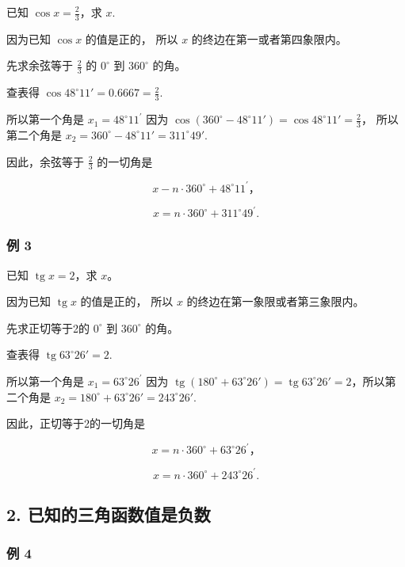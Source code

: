 已知 \(\cos x = \frac{2}{3}\)，求 \(x\).

 因为已知 \(\cos x\) 的值是正的， 所以 \(x\)
的终边在第一或者第四象限内。

先求余弦等于 \(\frac{2}{3}\) 的 \(0^{\circ}\) 到 \(360^{\circ}\) 的角。

查表得 \(\cos 48^{\circ}11' = 0.6667 = \frac{2}{3}\).

所以第一个角是 \(x_{1} = 48^{\circ}11^{\prime}\) 因为
\(\cos (360^{\circ} - 48^{\circ}11') = \cos 48^{\circ}11' = \frac{2}{3}\)，
所以第二个角是 \(x_{2} = 360^{\circ} - 48^{\circ}11' = 311^{\circ}49'\).

因此，余弦等于 \(\frac{2}{3}\) 的一切角是

\[
x - n \cdot 360 ^{\circ} + 48 ^{\circ} 11 ^{\prime}\text{，}
\]

\[
x = n \cdot 360 ^{\circ} + 311 ^{\circ} 49 ^{\prime}.
\]

\subsubsection{例 3}

已知 \(\operatorname{tg} x = 2\)，求 \(x\)。

 因为已知 \(\operatorname{tg} x\) 的值是正的， 所以 \(x\)
的终边在第一象限或者第三象限内。

先求正切等于2的 \(0^{\circ}\) 到 \(360^{\circ}\) 的角。

查表得 \(\operatorname{tg} 63^{\circ} 26' = 2\).

所以第一个角是 \(x_{1} = 63^{\circ}26^{\prime}\) 因为
\(\operatorname{tg}(180^{\circ} + 63^{\circ}26') = \operatorname{tg}63^{\circ}26' = 2\)，所以第二个角是
\(x_{2} = 180^{\circ} + 63^{\circ}26' = 243^{\circ}26'\).

因此，正切等于2的一切角是

\[
x = n \cdot 360 ^{\circ} + 63 ^{\circ} 26 ^{\prime}\text{，}
\]

\[
x = n\cdot360^{\circ} + 243 ^{\circ} 26 ^{\prime}.
\]

\subsection{2. 已知的三角函数值是负数}

\subsubsection{例 4}

